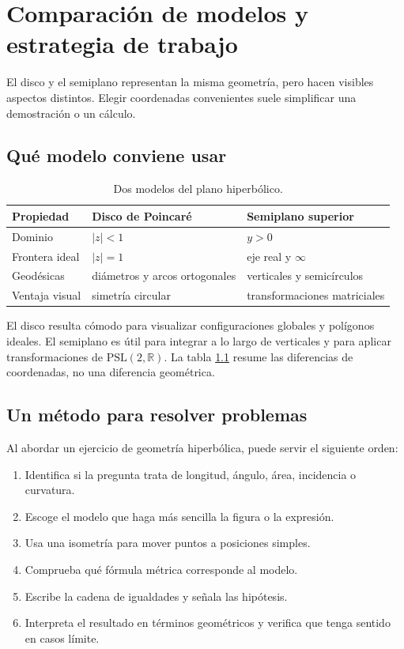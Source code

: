 \chapter{Comparación de modelos y estrategia de trabajo}
\label{cap:comparacion-modelos}

El disco y el semiplano representan la misma geometría, pero hacen visibles aspectos distintos. Elegir coordenadas convenientes suele simplificar una demostración o un cálculo.

\section{Qué modelo conviene usar}

\begin{table}[htbp]
  \centering
  \caption{Dos modelos del plano hiperbólico.}
  \label{tab:modelos}
  \small
  \begin{tabular}{p{}p{}p{}}
    \toprule
    Propiedad & Disco de Poincaré & Semiplano superior \\
    \midrule
    Dominio & \( |z|<1 \) & \( y>0 \) \\
    Frontera ideal & \( |z|=1 \) & eje real y \(\infty\) \\
    Geodésicas & diámetros y arcos ortogonales & verticales y semicírculos \\
    Ventaja visual & simetría circular & transformaciones matriciales \\
    \bottomrule
  \end{tabular}
\end{table}

El disco resulta cómodo para visualizar configuraciones globales y polígonos ideales. El semiplano es útil para integrar a lo largo de verticales y para aplicar transformaciones de \(\mathrm{PSL}(2,\mathbb R)\). La tabla \cref{tab:modelos} resume las diferencias de coordenadas, no una diferencia geométrica.

\section{Un método para resolver problemas}

Al abordar un ejercicio de geometría hiperbólica, puede servir el siguiente orden:
\begin{enumerate}
  \item Identifica si la pregunta trata de longitud, ángulo, área, incidencia o curvatura.
  \item Escoge el modelo que haga más sencilla la figura o la expresión.
  \item Usa una isometría para mover puntos a posiciones simples.
  \item Comprueba qué fórmula métrica corresponde al modelo.
  \item Escribe la cadena de igualdades y señala las hipótesis.
  \item Interpreta el resultado en términos geométricos y verifica que tenga sentido en casos límite.
\end{enumerate}

